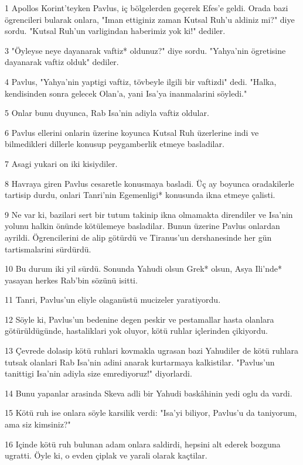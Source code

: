 \par 1 Apollos Korint'teyken Pavlus, iç bölgelerden geçerek Efes'e geldi. Orada bazi ögrencileri bularak onlara, "Iman ettiginiz zaman Kutsal Ruh'u aldiniz mi?" diye sordu. "Kutsal Ruh'un varligindan haberimiz yok ki!" dediler.
\par 3 "Öyleyse neye dayanarak vaftiz* oldunuz?" diye sordu. "Yahya'nin ögretisine dayanarak vaftiz olduk" dediler.
\par 4 Pavlus, "Yahya'nin yaptigi vaftiz, tövbeyle ilgili bir vaftizdi" dedi. "Halka, kendisinden sonra gelecek Olan'a, yani Isa'ya inanmalarini söyledi."
\par 5 Onlar bunu duyunca, Rab Isa'nin adiyla vaftiz oldular.
\par 6 Pavlus ellerini onlarin üzerine koyunca Kutsal Ruh üzerlerine indi ve bilmedikleri dillerle konusup peygamberlik etmeye basladilar.
\par 7 Asagi yukari on iki kisiydiler.
\par 8 Havraya giren Pavlus cesaretle konusmaya basladi. Üç ay boyunca oradakilerle tartisip durdu, onlari Tanri'nin Egemenligi* konusunda ikna etmeye çalisti.
\par 9 Ne var ki, bazilari sert bir tutum takinip ikna olmamakta direndiler ve Isa'nin yolunu halkin önünde kötülemeye basladilar. Bunun üzerine Pavlus onlardan ayrildi. Ögrencilerini de alip götürdü ve Tiranus'un dershanesinde her gün tartismalarini sürdürdü.
\par 10 Bu durum iki yil sürdü. Sonunda Yahudi olsun Grek* olsun, Asya Ili'nde* yasayan herkes Rab'bin sözünü isitti.
\par 11 Tanri, Pavlus'un eliyle olaganüstü mucizeler yaratiyordu.
\par 12 Söyle ki, Pavlus'un bedenine degen peskir ve pestamallar hasta olanlara götürüldügünde, hastaliklari yok oluyor, kötü ruhlar içlerinden çikiyordu.
\par 13 Çevrede dolasip kötü ruhlari kovmakla ugrasan bazi Yahudiler de kötü ruhlara tutsak olanlari Rab Isa'nin adini anarak kurtarmaya kalkistilar. "Pavlus'un tanittigi Isa'nin adiyla size emrediyoruz!" diyorlardi.
\par 14 Bunu yapanlar arasinda Skeva adli bir Yahudi baskâhinin yedi oglu da vardi.
\par 15 Kötü ruh ise onlara söyle karsilik verdi: "Isa'yi biliyor, Pavlus'u da taniyorum, ama siz kimsiniz?"
\par 16 Içinde kötü ruh bulunan adam onlara saldirdi, hepsini alt ederek bozguna ugratti. Öyle ki, o evden çiplak ve yarali olarak kaçtilar.
